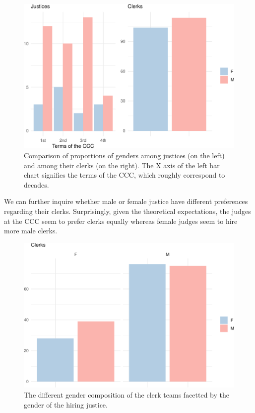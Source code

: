 \documentclass[
  11pt,
]{article}
\begin{document}
\begin{figure}
\centering
\includegraphics{apex_courts_dataset_files/figure-latex/gender1-1.pdf}
\caption{Comparison of proportions of genders among justices (on the
left) and among their clerks (on the right). The X axis of the left bar
chart signifies the terms of the CCC, which roughly correspond to
decades.}
\end{figure}

We can further inquire whether male or female justice have different
preferences regarding their clerks. Surprisingly, given the theoretical
expectations, the judges at the CCC seem to prefer clerks equally
whereas female judges seem to hire more male clerks.

\begin{figure}
\centering
\includegraphics{apex_courts_dataset_files/figure-latex/gender2-1.pdf}
\caption{The different gender composition of the clerk teams facetted by
the gender of the hiring justice.}
\end{figure}
\end{document}
